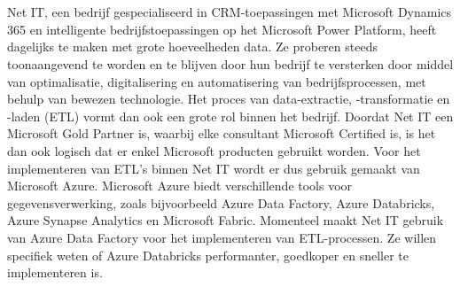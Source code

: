 
\chapter{}%
\label{ch:inleiding}

%

\section{}%
\label{sec:probleemstelling}

Net IT, een bedrijf gespecialiseerd in CRM-toepassingen met Microsoft Dynamics 365 en intelligente bedrijfstoepassingen op het Microsoft Power Platform, heeft dagelijks te maken met grote hoeveelheden data. Ze proberen steeds toonaangevend te worden en te blijven door hun bedrijf te versterken door middel van optimalisatie, digitalisering en automatisering van bedrijfsprocessen, met behulp van bewezen technologie. Het proces van data-extractie, -transformatie en -laden (ETL) vormt dan ook een grote rol binnen het bedrijf. Doordat Net IT een Microsoft Gold Partner is, waarbij elke consultant Microsoft Certified is, is het dan ook logisch dat er enkel Microsoft producten gebruikt worden. Voor het implementeren van ETL's binnen Net IT wordt er dus gebruik gemaakt van Microsoft Azure. Microsoft Azure biedt verschillende tools voor gegevensverwerking, zoals bijvoorbeeld Azure Data Factory, Azure Databricks, Azure Synapse Analytics en Microsoft Fabric. Momenteel maakt Net IT gebruik van Azure Data Factory voor het implementeren van ETL-processen. Ze willen specifiek weten of Azure Databricks performanter, goedkoper en sneller te implementeren is.

